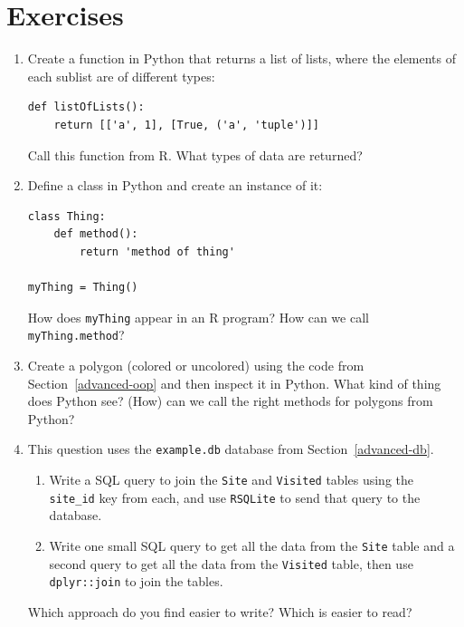 \section{Exercises}

\begin{enumerate}

\item
  Create a function in Python that returns a list of lists,
  where the elements of each sublist are of different types:

\begin{lstlisting}
def listOfLists():
    return [['a', 1], [True, ('a', 'tuple')]]
\end{lstlisting}

  \noindent
  Call this function from R.
  What types of data are returned?

\item
  Define a class in Python and create an instance of it:

\begin{lstlisting}
class Thing:
    def method():
        return 'method of thing'

myThing = Thing()
\end{lstlisting}

  \noindent
  How does \texttt{myThing} appear in an R program?
  How can we call \texttt{myThing.method}?

\item
  Create a polygon (colored or uncolored) using the code from Section~\ref{advanced-oop}
  and then inspect it in Python.
  What kind of thing does Python see?
  (How) can we call the right methods for polygons from Python?

\item
  This question uses the \texttt{example.db} database from Section~\ref{advanced-db}.
  \begin{enumerate}
  \item
    Write a SQL query to join the \texttt{Site} and \texttt{Visited} tables
    using the \texttt{site\_id} key from each,
    and use \texttt{RSQLite} to send that query to the database.
  \item
    Write one small SQL query to get all the data from the \texttt{Site} table
    and a second query to get all the data from the \texttt{Visited} table,
    then use \texttt{dplyr::join} to join the tables.
  \end{enumerate}
  Which approach do you find easier to write?
  Which is easier to read?

\end{enumerate}
